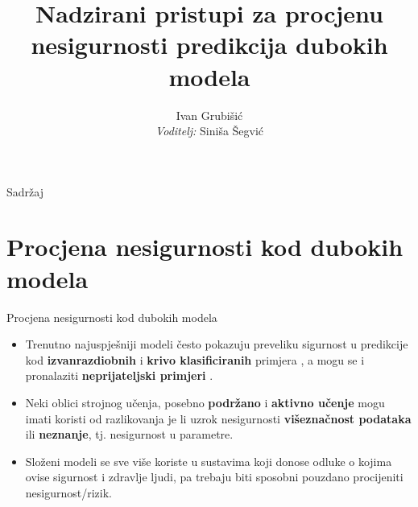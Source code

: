 \documentclass{beamer}
\title{Nadzirani pristupi za procjenu nesigurnosti predikcija dubokih modela}
\author{Ivan Grubišić \\ \emph{Voditelj:} Siniša Šegvić}
\institute{Fakultet elektrotehnike i računarstva}
\date{}
\begin{document}
	
\begin{frame}
  \titlepage
\end{frame}

\begin{frame}{Sadržaj}
  \tableofcontents
\end{frame}


\section{Procjena nesigurnosti kod dubokih modela}

\begin{frame}{Procjena nesigurnosti kod dubokih modela}
	\begin{itemize}
		\item Trenutno najuspješniji modeli često pokazuju preveliku sigurnost u predikcije kod \textbf{izvanrazdiobnih} i \textbf{krivo klasificiranih} primjera \citep{Nguyen:2015:DNNEFHCPUI,Guo:2017:CMNN,Hendrycks:2016:BDMOODE}, a mogu se i pronalaziti \textbf{neprijateljski primjeri}  \citep{Szegedy:2013:IPNN,Goodfellow:2014:EHAE}.
		\item Neki oblici strojnog učenja, posebno \textbf{podržano} i \textbf{aktivno učenje} mogu imati koristi od razlikovanja je li uzrok nesigurnosti \textbf{višeznačnost podataka} ili \textbf{neznanje}, tj. nesigurnost u parametre.
		\item Složeni modeli se sve više koriste u sustavima koji donose odluke o kojima ovise sigurnost i zdravlje ljudi, pa trebaju biti sposobni pouzdano procijeniti nesigurnost/rizik.
	\end{itemize}
\end{frame}
\end{document}
